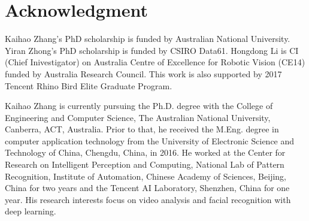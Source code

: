 \documentclass[journal]{IEEEtran}
\begin{document}
\section*{Acknowledgment}
Kaihao Zhang's PhD scholarship is funded by Australian National University. Yiran Zhong's PhD scholarship is funded by CSIRO Data61. Hongdong Li is CI (Chief Inivestigator) on Australia Centre of Excellence for Robotic Vision (CE14) funded by Australia Research Council. This work is also supported by 2017 Tencent Rhino Bird Elite Graduate Program.



\ifCLASSOPTIONcaptionsoff
  \newpage
\fi








{


}




\begin{IEEEbiography}{Kaihao Zhang}
is currently pursuing the Ph.D. degree with the College of Engineering and Computer Science, The Australian National University, Canberra, ACT, Australia. Prior to that, he received the M.Eng. degree in computer application technology from the University of Electronic Science and Technology of China, Chengdu, China, in 2016. He worked at the Center for Research on Intelligent Perception and Computing, National Lab of Pattern Recognition, Institute of Automation, Chinese Academy of Sciences, Beijing, China for two years and the Tencent AI Laboratory, Shenzhen, China for one year. His research interests focus on video analysis and facial recognition with deep learning.
\end{IEEEbiography}
\end{document}
